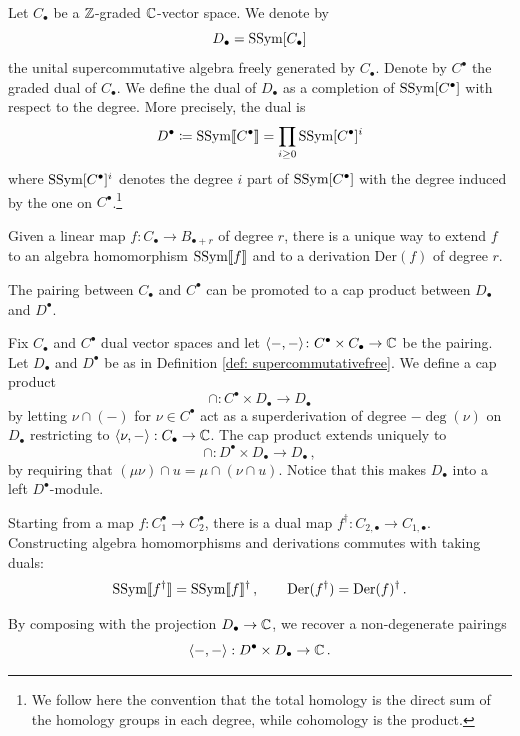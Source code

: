 \documentclass[a4paper, 12pt]{amsart}
\begin{document}
\begin{definition}\label{def: supercommutativefree}
Let $C_\bullet$ be a ${\mathbb{Z}}$-graded  ${\mathbb{C}}$-vector space. We denote by $$D_\bullet = \text{SSym}[C_\bullet]$$ the unital supercommutative algebra freely generated by $C_\bullet$. Denote by $C^\bullet$ the graded dual of $C_\bullet$. We define the dual of $D_\bullet$ as a completion of $\text{SSym}[C^\bullet]$ with respect to the degree. More precisely, the dual is
\[D^\bullet\coloneqq \text{SSym}\llbracket C^\bullet\rrbracket=\prod_{i\geq 0}\text{SSym}[C^\bullet]^i\]
where $\text{SSym}[C^\bullet]^i$ denotes the degree $i$ part of $\text{SSym}[C^\bullet]$ with the degree induced by the one on $C^\bullet$.\footnote{We follow here the convention that the total homology is the direct sum of the homology groups in each degree, while cohomology is the product.} 
\end{definition}
Given a linear map $f\colon C_\bullet\to B_{\bullet+r}$ of degree $r$, there is a unique way to extend $f$ to an algebra homomorphism $\text{SSym}\llbracket f\rrbracket$ and to a derivation $\text{Der}(f)$ of degree $r$.

The pairing between $C_\bullet$ and $C^\bullet$ can be promoted to a cap product between $D_\bullet$ and $D^\bullet$. 
\begin{definition}
\label{Def: pairingofV}
Fix $C_\bullet$ and $C^\bullet$ dual vector spaces and let $\langle-,-\rangle\colon C^\bullet\times C_\bullet\to {\mathbb{C}}$ be the pairing. Let $D_\bullet$ and $D^\bullet$ be as in Definition \ref{def: supercommutativefree}.
We define a cap product
$$
\cap\colon C^\bullet\times D_\bullet\longrightarrow D_\bullet
$$
by letting $\nu\cap(-)$ for $\nu\in C^\bullet$ act as a superderivation of degree $-\deg(\nu)$ on $D_\bullet$  restricting to $\langle \nu,-\rangle: C_\bullet\to{\mathbb{C}}$. The cap product extends uniquely to
$$
\cap\colon D^\bullet\times D_\bullet\longrightarrow D_\bullet\,,
$$
by requiring that $(\mu \nu) \cap u = \mu\cap(\nu\cap u)$. Notice that this makes $D_{\bullet}$ into a left $D^\bullet$-module.

Starting from a map $f: C_1^\bullet\to C_2^\bullet$, there is a dual map $f^{\dagger}:C_{2,\bullet}\to C_{1,\bullet}$. Constructing algebra homomorphisms and derivations commutes with taking duals: $$\text{SSym}\llbracket f^\dagger\rrbracket = \text{SSym}\llbracket f\rrbracket^ \dagger\,,\qquad \text{Der}(f^\dagger) = \text{Der}(f)^\dagger\,.$$

By composing with the projection $D_\bullet\to {\mathbb{C}}$, we recover a non-degenerate pairings $$\langle -,-\rangle: D^\bullet\times D_\bullet\to {\mathbb{C}}\,.$$
\end{definition}
\end{document}
